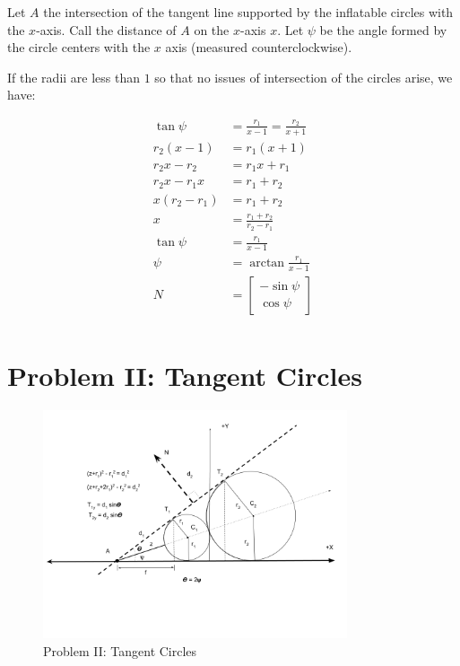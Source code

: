 \documentclass{article}
\begin{document}
Let $A$ the intersection of the tangent line supported
by the inflatable circles with the $x$-axis. Call the distance of $A$
on the $x$-axis $x$. Let $\psi$ be the angle formed by the
circle centers with the $x$ axis (measured counterclockwise).

If the radii are less than $1$ so that no issues of intersection
of the circles arise, we have:

\begin{align}
  \tan{\psi} &= \frac{r_1}{x-1} = \frac{r_2}{x+1}  \\
  r_2(x - 1) &= r_1(x+1) \\
  r_2x - r_2 &= r_1x + r_1 \\
  r_2x - r_1x &= r_1 + r_2 \\
  x(r_2 - r_1) &= r_1 + r_2 \\
  x &= \frac{r_1+r_2}{r_2 - r_1} \\
  \tan{\psi} &= \frac{r_1}{x - 1} \\
  \psi &= \arctan{\frac{r_1}{x - 1}} \\
  N &=  \begin{bmatrix} -\sin{\psi} \\ \cos{\psi}  \end{bmatrix} \\
\end{align}





\section{Problem II: Tangent Circles}



\begin{figure}
     \centering
     \includegraphics[width=0.80\textwidth]{figures/TangentCirclesGeneral.png}
     \caption{Problem II: Tangent Circles}
  \label{fig:Tangent}
\end{figure}
\end{document}
